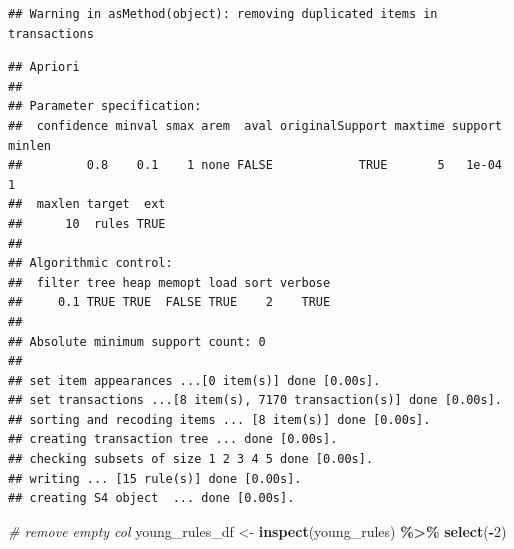 \documentclass[
]{article}
\newenvironment{Shaded}{\begin{snugshade}}{\end{snugshade}}
\newcommand{\CommentTok}[1]{\textcolor[rgb]{0.56,0.35,0.01}{\textit{#1}}}
\newcommand{\DecValTok}[1]{\textcolor[rgb]{0.00,0.00,0.81}{#1}}
\newcommand{\FunctionTok}[1]{\textcolor[rgb]{0.13,0.29,0.53}{\textbf{#1}}}
\newcommand{\NormalTok}[1]{#1}
\newcommand{\OtherTok}[1]{\textcolor[rgb]{0.56,0.35,0.01}{#1}}
\newcommand{\SpecialCharTok}[1]{\textcolor[rgb]{0.81,0.36,0.00}{\textbf{#1}}}
\begin{document}
\begin{verbatim}
## Warning in asMethod(object): removing duplicated items in transactions
\end{verbatim}

\begin{verbatim}
## Apriori
## 
## Parameter specification:
##  confidence minval smax arem  aval originalSupport maxtime support minlen
##         0.8    0.1    1 none FALSE            TRUE       5   1e-04      1
##  maxlen target  ext
##      10  rules TRUE
## 
## Algorithmic control:
##  filter tree heap memopt load sort verbose
##     0.1 TRUE TRUE  FALSE TRUE    2    TRUE
## 
## Absolute minimum support count: 0 
## 
## set item appearances ...[0 item(s)] done [0.00s].
## set transactions ...[8 item(s), 7170 transaction(s)] done [0.00s].
## sorting and recoding items ... [8 item(s)] done [0.00s].
## creating transaction tree ... done [0.00s].
## checking subsets of size 1 2 3 4 5 done [0.00s].
## writing ... [15 rule(s)] done [0.00s].
## creating S4 object  ... done [0.00s].
\end{verbatim}

\begin{Shaded}
\begin{Highlighting}[]
\CommentTok{\# remove empty col}
\NormalTok{young\_rules\_df }\OtherTok{\textless{}{-}} \FunctionTok{inspect}\NormalTok{(young\_rules) }\SpecialCharTok{\%\textgreater{}\%} \FunctionTok{select}\NormalTok{(}\SpecialCharTok{{-}}\DecValTok{2}\NormalTok{)}
\end{Highlighting}
\end{Shaded}
\end{document}
